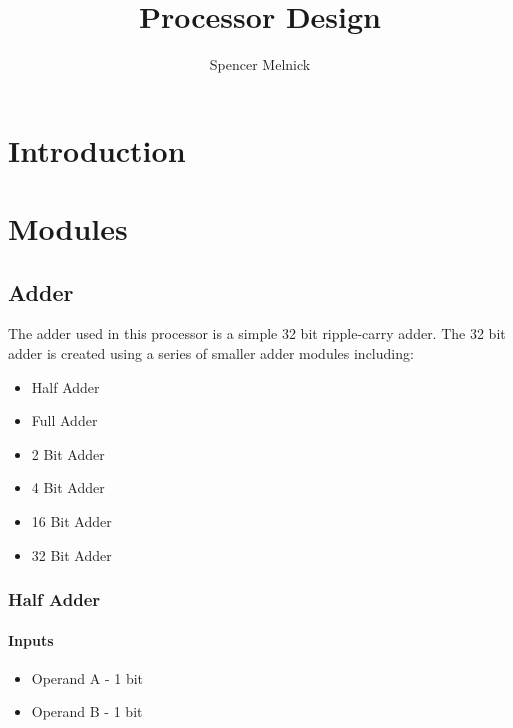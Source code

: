 \documentclass{article}
\begin{document}
    \title{Processor Design}
    \author{Spencer Melnick}

    \maketitle
    \tableofcontents
    \pagebreak

    \section{Introduction}

    \section{Modules}

    \subsection{Adder}

    The adder used in this processor is a simple 32 bit ripple-carry adder.
    The 32 bit adder is created using a series of smaller adder modules
    including:
    
    \begin{itemize}
        \item Half Adder
        \item Full Adder
        \item 2 Bit Adder
        \item 4 Bit Adder
        \item 16 Bit Adder
        \item 32 Bit Adder
    \end{itemize}




    \subsubsection{Half Adder}

    \paragraph{Inputs}
    \begin{itemize}
        \item Operand A - 1 bit
        \item Operand B - 1 bit
    \end{itemize}
\end{document}
